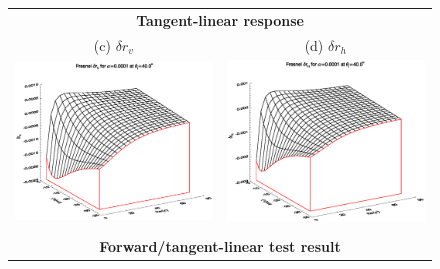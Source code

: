 \begin{figure}[htp]
\begin{tabular}{c c}
    \multicolumn{2}{c}{\sffamily\textbf{Tangent-linear response}}\\
    \textsf{(c)} $\delta r_v$ &
    \textsf{(d)} $\delta r_h$ \\
    \includegraphics[bb=115 240 508 540,clip,scale=0.5]{graphics/Fresnel/FWDTL/TLdrv_a0.0001_z40.0.eps} &
    \includegraphics[bb=120 240 508 540,clip,scale=0.5]{graphics/Fresnel/FWDTL/TLdrh_a0.0001_z40.0.eps} \\\\
    \multicolumn{2}{c}{\sffamily\textbf{Forward/tangent-linear test result}}\\

\end{tabular}
\end{figure}

